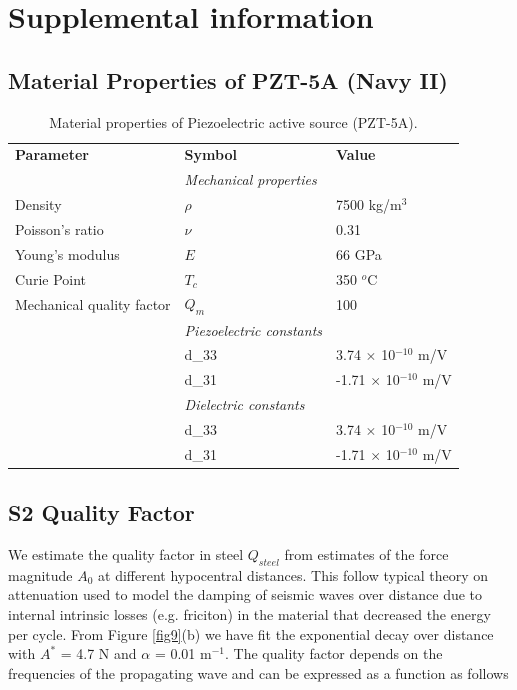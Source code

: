 \documentclass[preprint,3p, 11pt,authoryear]{elsarticle}
\begin{document}
{ 


\clearpage
\section*{Supplemental information}

\subsection{Material Properties of PZT-5A (Navy II)}

\begin{table}[ht]
	\centering
	\caption{Material properties of Piezoelectric active source (PZT-5A).}
	\begin{tabular}{ m{5cm} m{2cm} m{4cm}} 
		\hline  
		\bf{Parameter} 		      & \bf{Symbol} 	  & \bf{Value}	\\
	   & \textit{Mechanical properties} & \\
	    Density                   & $\rho$            & 7500 kg/m$^{3}$\\
	    Poisson's ratio           & $\nu$             & 0.31\\
	    Young's modulus           & $E$               & 66 GPa\\
        Curie Point               & $T_{c}$           & 350 $^{o}$C\\  
        Mechanical quality factor &   $Q_{m}$         & 100\\
	  & \textit{Piezoelectric constants} & \\
 	  & d_{33}                   & 3.74 $\times$ 10$^{-10}$ m/V\\
 	  & d_{31}                   & -1.71 $\times$ 10$^{-10}$ m/V\\
	  & \textit{Dielectric constants} & \\
 	  & d_{33}                   & 3.74 $\times$ 10$^{-10}$ m/V\\
 	  & d_{31}                   & -1.71 $\times$ 10$^{-10}$ m/V\\

	       
		\hline  	
	\end{tabular}
	\label{table1}
\end{table}

\clearpage
\subsection{S2 Quality Factor}
We estimate the quality factor in steel $Q_{steel}$ from estimates of the force magnitude $A_{0}$ at different hypocentral distances. This follow typical theory on attenuation used to model the damping of seismic waves over distance due to internal intrinsic losses (e.g. friciton) in the material that decreased the energy per cycle\citep[e.g.][]{Barton2007}. From Figure \ref{fig9}(b) we have fit the exponential decay over distance with $A^{*}$ = 4.7 N and $\alpha$ = 0.01 m$^{-1}$. The quality factor depends on the frequencies of the propagating wave and can be expressed as a function as follows

}
\end{document}
